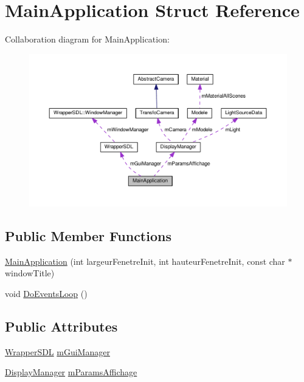 \hypertarget{struct_main_application}{\section{Main\+Application Struct Reference}
\label{struct_main_application}
}


Collaboration diagram for Main\+Application\+:
\nopagebreak
\begin{figure}[H]
\begin{center}
\leavevmode
\includegraphics[width=350pt]{struct_main_application__coll__graph}
\end{center}
\end{figure}
\subsection*{Public Member Functions}
\begin{DoxyCompactItemize}
\item 
\hyperlink{struct_main_application_ad1e259bb34972221793fefdb28967398}{Main\+Application} (int largeur\+Fenetre\+Init, int hauteur\+Fenetre\+Init, const char $\ast$window\+Title)
\item 
void \hyperlink{struct_main_application_a78dc7f7ce43e64e50eb74d1a0167aefb}{Do\+Events\+Loop} ()
\end{DoxyCompactItemize}
\subsection*{Public Attributes}
\begin{DoxyCompactItemize}
\item 
\hyperlink{struct_wrapper_s_d_l}{Wrapper\+S\+D\+L} \hyperlink{struct_main_application_a02a37af569312e07b3bd8f8995ef50ec}{m\+Gui\+Manager}
\item 
\hyperlink{class_display_manager}{Display\+Manager} \hyperlink{struct_main_application_a6d4bd1a7fbe48146153e7cb5082d6c15}{m\+Params\+Affichage}
\end{DoxyCompactItemize}


